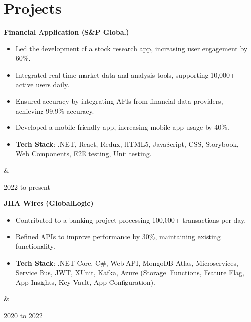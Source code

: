 \documentclass[10pt, letterpaper]{article}
\newenvironment{highlights}{
        \begin{itemize}[
                topsep=0pt,
                parsep=0.10 cm,
                partopsep=0pt,
                itemsep=0pt,
                after=\vspace{-1\baselineskip},
                leftmargin=0.4 cm + 3pt
            ]
    }{
        \end{itemize}
    } %
\let\originalTabularx\tabularx
\let\originalEndTabularx\endtabularx
\renewenvironment{tabularx}{\bgroup\centering\originalTabularx}{\originalEndTabularx\par\egroup}
\begin{document}
    
    \section{Projects}

        \begin{tabularx}{
            \textwidth-0.4 cm-0.13cm
        }{
            K{0.2 cm}
            R{4.1 cm}
        }
            \textbf{Financial Application (S\&P Global)}

            \vspace{0.10 cm}

            \begin{highlights}
                \item Led the development of a stock research app, increasing user engagement by 60\%.
                \item Integrated real-time market data and analysis tools, supporting 10,000+ active users daily.
                \item Ensured accuracy by integrating APIs from financial data providers, achieving 99.9\% accuracy.
                \item Developed a mobile-friendly app, increasing mobile app usage by 40\%.
                \item \textbf{Tech Stack}: .NET, React, Redux, HTML5, JavaScript, CSS, Storybook, Web Components, E2E testing, Unit testing.
            \end{highlights}
            &
            

            2022 to present
        \end{tabularx}


        \vspace{0.2 cm}
        \begin{tabularx}{
            \textwidth-0.4 cm-0.13cm
        }{
            K{0.2 cm}
            R{4.1 cm}
        }
            \textbf{JHA Wires (GlobalLogic)}

            \vspace{0.10 cm}

            \begin{highlights}
                \item Contributed to a banking project processing 100,000+ transactions per day.
                \item Refined APIs to improve performance by 30\%, maintaining existing functionality.
                \item \textbf{Tech Stack}: .NET Core, C\#, Web API, MongoDB Atlas, Microservices, Service Bus, JWT, XUnit, Kafka, Azure (Storage, Functions, Feature Flag, App Insights, Key Vault, App Configuration).
            \end{highlights}
            &
            

            2020 to 2022
        \end{tabularx}
\end{document}
